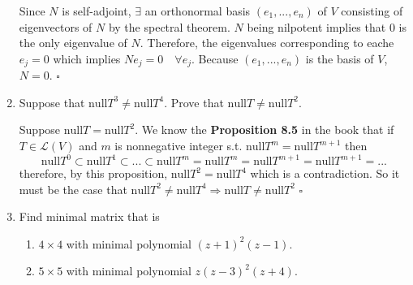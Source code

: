 \documentclass[10pt]{article}
\newenvironment{proof}{\noindent{\bf Proof.}}{\hfill $\square$\medskip}
\begin{document}
\begin{enumerate}
        \begin{proof}
            Since $N$ is self-adjoint, $\exists$ an orthonormal basis $(e_{1},...,e_{n})$ of $V$ consisting of eigenvectors of $N$ by the spectral theorem. $N$ being nilpotent implies that $0$ is the only eigenvalue of $N$. Therefore, the eigenvalues corresponding to eache $e_{j}=0$ which implies $Ne_{j}=0\quad\forall e_{j}$. Because $(e_{1},...,e_{n})$ is the basis of $V$, $N=0$.
        \end{proof}

        \item Suppose that $\text{null}T^{3}\neq\text{null}T^{4}$. Prove that $\text{null}T\neq\text{null}T^{2}$.
        
        \begin{proof}
            Suppose $\text{null}T=\text{null}T^{2}$. We know the \textbf{Proposition 8.5} in the book that if $T\in\mathcal{L}(V)$ and $m$ is nonnegative integer s.t. $\text{null}T^{m}=\text{null}T^{m+1}$ then 
            $$\text{null}T^{0}\subset\text{null}T^{1}\subset...\subset\text{null}T^{m}=\text{null}T^{m}=\text{null}T^{m+1}=\text{null}T^{m+1}=...$$ therefore, by this proposition, $\text{null}T^{2}=\text{null}T^{4}$ which is a contradiction. So it must be the case that $\text{null}T^{2}\neq\text{null}T^{4}\Rightarrow\text{null}T\neq\text{null}T^{2}$
        \end{proof}
        
        \item Find minimal matrix that is
        \begin{enumerate}[label=\textbf{(\alph*)}]
            \item $4\times4$ with minimal polynomial $(z+1)^{2}(z-1)$.
            \item $5\times5$ with minimal polynomial $z(z-3)^{2}(z+4)$.
        \end{enumerate}


\end{enumerate}
\end{document}

